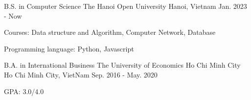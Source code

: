 \begin{cventries} %
  \cventry
    {B.S. in Computer Science} %
    {The Hanoi Open University } %
    {Hanoi, Vietnam} %
    {Jan. 2023 - Now} %
    {
      \begin{cvitems} %
        \item {Courses: Data structure and Algorithm, Computer Network, Database}
        \item {Programming language: Python, Javascript}
      \end{cvitems}
    }

   \cventry
    {B.A. in International Business} %
    {The University of Economics Ho Chi Minh City} %
    {Ho Chi Minh City, VietNam} %
    {Sep. 2016 - May. 2020} %
    {
      \begin{cvitems} %
        \item {GPA: 3.0/4.0}
      \end{cvitems}
    }

\end{cventries}
